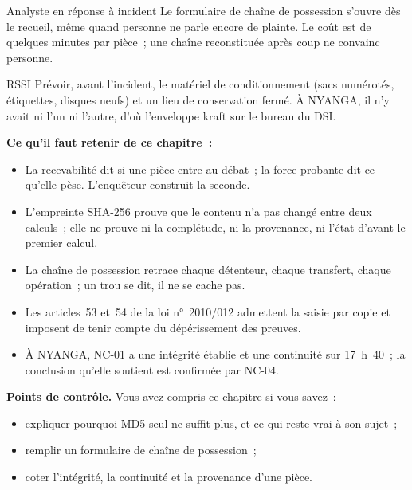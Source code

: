 \begin{boxmetier}{Analyste en réponse à incident}
Le formulaire de chaîne de possession s'ouvre dès le recueil, même quand
personne ne parle encore de plainte. Le coût est de quelques minutes par
pièce~; une chaîne reconstituée après coup ne convainc personne.
\end{boxmetier}

\begin{boxmetier}{RSSI}
Prévoir, avant l'incident, le matériel de conditionnement (sacs numérotés,
étiquettes, disques neufs) et un lieu de conservation fermé. À NYANGA, il
n'y avait ni l'un ni l'autre, d'où l'enveloppe kraft sur le bureau du DSI.
\end{boxmetier}

\separateur

\begin{boxresume}
\textbf{Ce qu'il faut retenir de ce chapitre~:}
\begin{itemize}
    \item La recevabilité dit si une pièce entre au débat~; la force
          probante dit ce qu'elle pèse. L'enquêteur construit la seconde.
    \item L'empreinte SHA-256 prouve que le contenu n'a pas changé entre
          deux calculs~; elle ne prouve ni la complétude, ni la provenance,
          ni l'état d'avant le premier calcul.
    \item La chaîne de possession retrace chaque détenteur, chaque
          transfert, chaque opération~; un trou se dit, il ne se cache pas.
    \item Les articles~53 et~54 de la loi n°~2010/012 admettent la saisie
          par copie et imposent de tenir compte du dépérissement des
          preuves.
    \item À NYANGA, NC-01 a une intégrité établie et une continuité \NEK{}
          sur 17~h~40~; la conclusion qu'elle soutient est confirmée par
          NC-04.
\end{itemize}
\end{boxresume}

\begin{boxinfo}
\textbf{Points de contrôle.} Vous avez compris ce chapitre si vous savez~:
\begin{itemize}
    \item expliquer pourquoi MD5 seul ne suffit plus, et ce qui reste vrai
          à son sujet~;
    \item remplir un formulaire de chaîne de possession~;
    \item coter l'intégrité, la continuité et la provenance d'une pièce.
\end{itemize}
\end{boxinfo}

